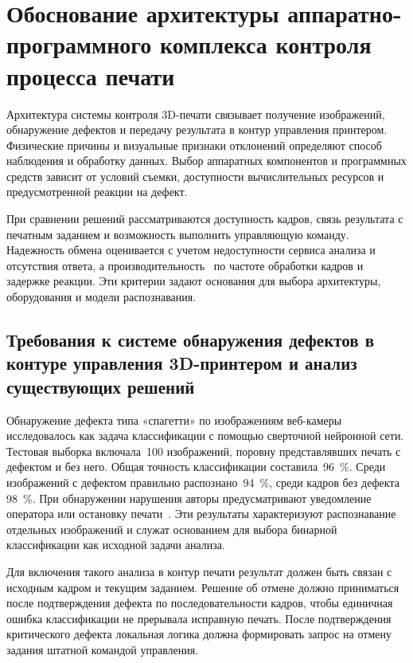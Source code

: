 \chapter{Обоснование архитектуры аппаратно-программного комплекса контроля процесса печати}

Архитектура системы контроля 3D-печати связывает получение изображений, обнаружение дефектов и передачу результата в контур управления принтером. Физические причины и визуальные признаки отклонений определяют способ наблюдения и обработку данных. Выбор аппаратных компонентов и программных средств зависит от условий съемки, доступности вычислительных ресурсов и предусмотренной реакции на дефект.

При сравнении решений рассматриваются доступность кадров, связь результата с печатным заданием и возможность выполнить управляющую команду. Надежность обмена оценивается с учетом недоступности сервиса анализа и отсутствия ответа, а производительность~\textemdash{} по частоте обработки кадров и задержке реакции. Эти критерии задают основания для выбора архитектуры, оборудования и модели распознавания.

\section{Требования к системе обнаружения дефектов в контуре управления 3D-принтером и анализ существующих решений}

Обнаружение дефекта типа «спагетти» по изображениям веб-камеры исследовалось как задача классификации с помощью сверточной нейронной сети. Тестовая выборка включала~100 изображений, поровну представлявших печать с дефектом и без него. Общая точность классификации составила~96~\%. Среди изображений с дефектом правильно распознано~94~\%, среди кадров без дефекта~\textemdash{} 98~\%. При обнаружении нарушения авторы предусматривают уведомление оператора или остановку печати~\cite{kim2020image}. Эти результаты характеризуют распознавание отдельных изображений и служат основанием для выбора бинарной классификации как исходной задачи анализа.

Для включения такого анализа в контур печати результат должен быть связан с исходным кадром и текущим заданием. Решение об отмене должно приниматься после подтверждения дефекта по последовательности кадров, чтобы единичная ошибка классификации не прерывала исправную печать. После подтверждения критического дефекта локальная логика должна формировать запрос на отмену задания штатной командой управления.

